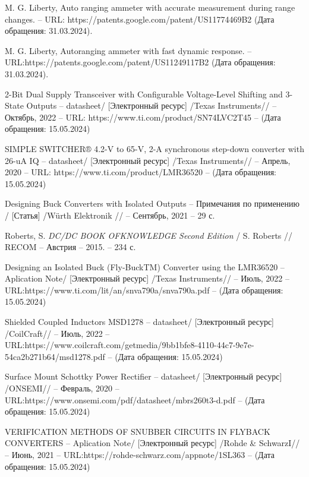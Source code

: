 \begin{thebibliography}{00}
 M. G. Liberty, Auto ranging ammeter with accurate measurement 
during range changes. -- URL:
https://patents.google.com/patent/US11774469B2 (Дата обращения: 31.03.2024).

 M. G. Liberty, Autoranging ammeter with fast dynamic response.
-- URL:https://patents.google.com/patent/US11249117B2 (Дата обращения: 31.03.2024).


 2-Bit Dual Supply Transceiver with Configurable 
Voltage-Level Shifting and 3-State Outputs
 -- datasheet/
  [Электронный ресурс] /Texas Instruments// -- Октябрь, 2022 -- 
  URL: https://www.ti.com/product/SN74LVC2T45
   -- (Дата обращения: 15.05.2024)

 SIMPLE SWITCHER® 4.2-V to 65-V, 
2-A synchronous step-down converter with 26-uA IQ
  -- datasheet/
  [Электронный ресурс] /Texas Instruments// -- Апрель, 2020 -- 
  URL: https://www.ti.com/product/LMR36520
  -- (Дата обращения: 15.05.2024)

Designing Buck Converters with Isolated Outputs 
-- Примечания по применению /
[Статья] /Würth Elektronik // -- Сентябрь, 2021 -- 29 с.

 Roberts, S.
\emph{DC/DC BOOK OFKNOWLEDGE Second Edition} / S. Roberts // RECOM --
Австрия -- 2015. -- 234 с.

 Designing an Isolated Buck (Fly-BuckTM) Converter using
the LMR36520
  -- Aplication Note/
  [Электронный ресурс] /Texas Instruments// -- Июль, 2022 -- 
  URL:https://www.ti.com/lit/an/snva790a/snva790a.pdf
  -- (Дата обращения: 15.05.2024)


 Shielded Coupled Inductors MSD1278
-- datasheet/
[Электронный ресурс] /CoilCraft// -- Июль, 2022 -- 
URL:https://www.coilcraft.com/getmedia/9bb1bfe8-4110-44c7-9e7e-54ca2b271b64/msd1278.pdf
-- (Дата обращения: 15.05.2024)

 Surface Mount Schottky Power Rectifier
-- datasheet/
[Электронный ресурс] /ONSEMI// -- Февраль, 2020 -- 
URL:https://www.onsemi.com/pdf/datasheet/mbrs260t3-d.pdf
-- (Дата обращения: 15.05.2024)

 VERIFICATION METHODS OF SNUBBER CIRCUITS IN FLYBACK
CONVERTERS
-- Aplication Note/
[Электронный ресурс] /Rohde \& SchwarzI// -- Июнь, 2021 -- 
URL:https://rohde-schwarz.com/appnote/1SL363
-- (Дата обращения: 15.05.2024)


\end{thebibliography}
